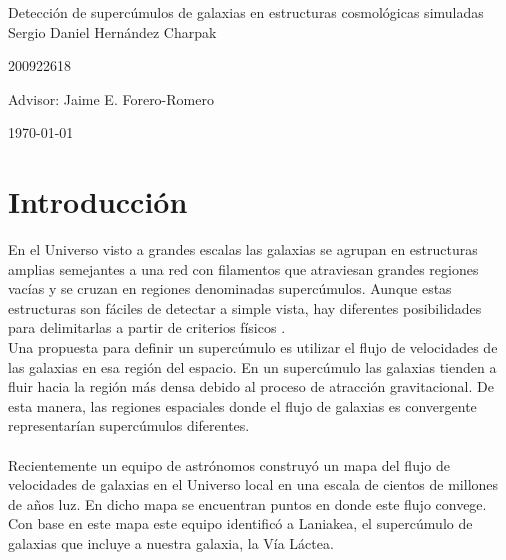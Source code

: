 \documentclass[12pt]{article}
\begin{document}
\begin{center}
\Huge
Detecci\'on de superc\'{u}mulos de galaxias en estructuras
cosmol\'{o}gicas simuladas\\  
\vspace{3mm}
\Large Sergio Daniel Hern\'{a}ndez Charpak

\large
200922618

\vspace{2mm}
\Large
Advisor: Jaime E. Forero-Romero

\normalsize
\vspace{2mm}

\today
\end{center}


\normalsize
\section{Introducci\'{o}n}
En el Universo visto a grandes escalas las galaxias se agrupan en
estructuras amplias semejantes a una red con filamentos que atraviesan
grandes regiones vac\'ias y se cruzan en regiones denominadas superc\'{u}mulos.
Aunque estas estructuras son f\'aciles de detectar a simple vista, hay
diferentes posibilidades para delimitarlas a partir de criterios
f\'isicos \cite{gott_iii_map_2005}.    
\\

Una propuesta para definir un superc\'umulo es utilizar el flujo de
velocidades de las galaxias en esa regi\'on del espacio.
En un superc\'umulo las galaxias tienden a fluir hacia la regi\'on
m\'as densa debido al proceso de atracci\'on gravitacional.
De esta manera, las regiones espaciales donde el flujo de galaxias es
convergente  representar\'ian superc\'umulos diferentes.\\
\\

Recientemente un equipo de astr\'{o}nomos construy\'o un mapa del flujo
de velocidades de galaxias en el Universo local en una escala de
cientos de millones de a\~nos luz\cite{tully_cosmicflows-2_2013}. 
En dicho mapa se encuentran puntos en donde este flujo convege. 
Con base en este mapa este equipo identific\'{o} a Laniakea, el
superc\'umulo de galaxias que incluye a nuestra galaxia, la V\'ia
L\'{a}ctea\cite{tully_laniakea_2014}. 
\\   
\end{document}
